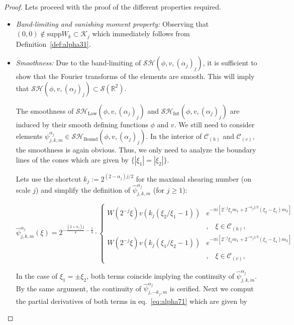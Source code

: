 \begin{proof}
Lets proceed with the proof of the different properties required.
\begin{itemize}
\item\textit{Band-limiting and vanishing moment property:} Observing that $(0,0)\notin \text{supp}W_k\subset \mathcal{K}_j$ which immediately follows from Definition~\ref{def:alpha31}.
\item\textit{Smoothness:} Due to the band-limiting of $\mathcal{SH}(\phi,v,(\alpha_j)_j)$, it is sufficient to show that the Fourier transforms of the elements are smooth. This will imply that $\mathcal{SH}(\phi,v,(\alpha_j)_j)\subset \mathcal{S}(\mathbb{R}^2)$. 

\bigskip

The smoothness of $\mathcal{SH}_{\text{Low}}(\phi,v,(\alpha_j)_j)$ and $\mathcal{SH}_{\text{Int}}(\phi,v,(\alpha_j)_j)$ are induced by their smooth defining functions $\phi$ and $v$. We still need to consider elements $\psi^{\alpha_j}_{j,k,m}\in\mathcal{SH}_{\text{Bound}}(\phi,v,(\alpha_j)_j)$. In the interior of $\mathcal{C}_{(h)}$ and $\mathcal{C}_{(v)}$, the smoothness is again obvious. Thus, we only need to analyze the boundary lines of the cones which are given by $\{|\xi_1|=|\xi_2|\}$.

\bigskip

Lets use the shortcut $k_j:=2^{(2-\alpha_j)j/2}$ for the maximal shearing number (on scale $j$) and simplify the definition of $\hat{\psi}_{j,k,m}^{\alpha_j}$ (for $j\geq 1$):

\begin{equation}
\label{eq:alpha71}
\hat{\psi}^{\alpha_j}_{j,k,m}(\xi)=2^{-\frac{(2+\alpha_j)j}{4}-\frac{1}{4}}\cdot
\begin{cases}
W(2^{-j}\xi)v(k_j(\xi_2/\xi_1-1))&e^{-\pi i[2^{-j}\xi_1 m_1+2^{-\alpha_j j/2}(\xi_2-\xi_1)m_2]}\\
& \textrm{,}\quad \xi\in\mathcal{C}_{(h)},\\
W(2^{-j}\xi)v(k_j(\xi_1/\xi_2-1))&e^{-\pi i[2^{-j}\xi_1 m_1+2^{-\alpha_j j/2}(\xi_1-\xi_1)m_2]}\\
&\textrm{,}\quad \xi\in\mathcal{C}_{(v)},
\end{cases}
\end{equation}

In the case of $\xi_1=\pm \xi_2$, both terms coincide implying the continuity of $\hat{\psi}_{j,k,m}^{\alpha_j}$. By the same argument, the continuity of $\hat{\psi}_{j,-k_j,m}^{\alpha_j}$ is cerified. Next we comput the partial derivatives of both terms in eq.~\ref{eq:alpha71} which are given by


\end{itemize}
\end{proof}
